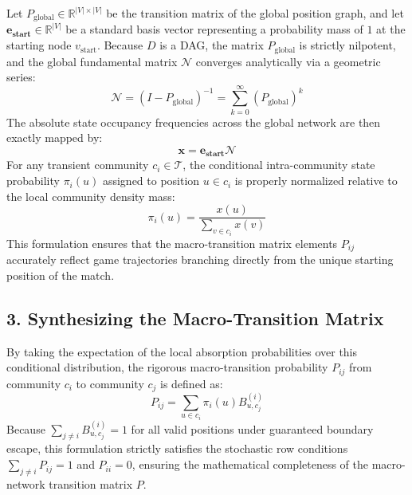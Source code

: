 \documentclass[9pt,twocolumn,twoside]{pnas-report}
\begin{document}
Let $P_{\text{global}} \in \mathbb{R}^{|V| \times |V|}$ be the transition matrix of the global position graph, and let $\mathbf{e_{\text{start}}} \in \mathbb{R}^{|V|}$ be a standard basis vector representing a probability mass of $1$ at the starting node $v_{\text{start}}$. Because $D$ is a DAG, the matrix $P_{\text{global}}$ is strictly nilpotent, and the global fundamental matrix $\mathcal{N}$ converges analytically via a geometric series:
\begin{equation}
\mathcal{N} = (I - P_{\text{global}})^{-1} = \sum_{k=0}^{\infty} (P_{\text{global}})^k
\end{equation}
The absolute state occupancy frequencies across the global network are then exactly mapped by:
\begin{equation}
\mathbf{x} = \mathbf{e_{\text{start}}}\mathcal{N}
\end{equation}
For any transient community $c_i \in \mathcal{T}$, the conditional intra-community state probability $\pi_i(u)$ assigned to position $u \in c_i$ is properly normalized relative to the local community density mass:
\begin{equation}
\pi_i(u) = \frac{x(u)}{\sum_{v \in c_i} x(v)}
\end{equation}
This formulation ensures that the macro-transition matrix elements $P_{ij}$ accurately reflect game trajectories branching directly from the unique starting position of the match.

\subsection*{3. Synthesizing the Macro-Transition Matrix}
By taking the expectation of the local absorption probabilities over this conditional distribution, the rigorous macro-transition probability $P_{ij}$ from community $c_i$ to community $c_j$ is defined as:
\begin{equation}
P_{ij} = \sum_{u \in c_i} \pi_i(u) B^{(i)}_{u,c_j}
\end{equation}
Because $\sum_{j \neq i} B^{(i)}_{u,c_j} = 1$ for all valid positions under guaranteed boundary escape, this formulation strictly satisfies the stochastic row conditions $\sum_{j \neq i} P_{ij} = 1$ and $P_{ii} = 0$, ensuring the mathematical completeness of the macro-network transition matrix $P$.
\end{document}
